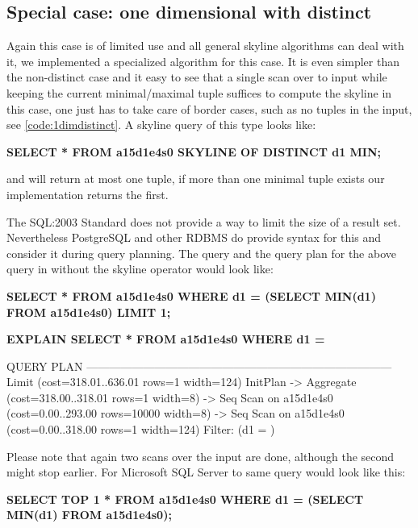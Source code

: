 \subsection{Special case: one dimensional with distinct}
\label{sec:onedim-distinct}
Again this case is of limited use and all general skyline algorithms
can deal with it, we implemented a specialized algorithm for this
case.  It is even simpler than the non-distinct case and it easy to
see that a single scan over to input while keeping the current
minimal/maximal tuple suffices to compute the skyline in this case,
one just has to take care of border cases, such as no tuples in the
input, see \autoref{code:1dimdistinct}. A skyline query of this type looks
like:

\begin{interactive}
\textbf{SELECT * FROM a15d1e4s0 SKYLINE OF DISTINCT d1 MIN;}
\end{interactive}

\noindent
and will return at most one tuple, if more than one minimal tuple
exists our implementation returns the first.

The SQL:2003 Standard \citep{SQL2003} does not provide a way
to limit the size of a result set. Nevertheless PostgreSQL and other
RDBMS do provide syntax for this and consider it during query
planning. The query and the query plan for the above query in without
the skyline operator would look like:

\begin{interactive}
\textbf{SELECT * FROM a15d1e4s0 WHERE d1 = (SELECT MIN(d1) FROM a15d1e4s0) LIMIT 1;}

\textbf{EXPLAIN SELECT * FROM a15d1e4s0 WHERE d1 = }\ellipsis

                                    QUERY PLAN                                   
---------------------------------------------------------------------------------
 Limit  (cost=318.01..636.01 rows=1 width=124)
   InitPlan
     ->  Aggregate  (cost=318.00..318.01 rows=1 width=8)
           ->  Seq Scan on a15d1e4s0  (cost=0.00..293.00 rows=10000 width=8)
   ->  Seq Scan on a15d1e4s0  (cost=0.00..318.00 rows=1 width=124)
         Filter: (d1 = )
\end{interactive}

\noindent
Please note that again two scans over the input are done, although the
second might stop earlier. For Microsoft SQL Server to same query
would look like this:

\begin{interactive}
\textbf{SELECT TOP 1 * FROM a15d1e4s0 WHERE d1 = (SELECT MIN(d1) FROM a15d1e4s0);}
\end{interactive}

